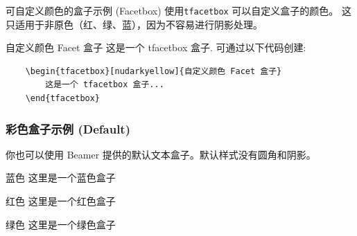 \documentclass[aspectratio=1610,fontset=none]{ctexbeamer}
\begin{document}
    \begin{frame}[fragile]{可自定义颜色的盒子示例 (Facetbox)}
        使用\texttt{tfacetbox} 可以自定义盒子的颜色。 这只适用于非原色（红、绿、蓝），因为不容易进行阴影处理。
        \begin{tfacetbox}[nudarkyellow]{自定义颜色 Facet 盒子}
            这是一个 tfacetbox 盒子. 可通过以下代码创建:
            \begin{verbatim}
    \begin{tfacetbox}[nudarkyellow]{自定义颜色 Facet 盒子}
        这是一个 tfacetbox 盒子...
    \end{tfacetbox}
            \end{verbatim}
        \end{tfacetbox}
    \end{frame}

    \begin{frame}
        \frametitle{彩色盒子示例 (Default)}
        你也可以使用 Beamer 提供的默认文本盒子。默认样式没有圆角和阴影。
        \begin{block}{蓝色}
            这里是一个蓝色盒子
        \end{block}
        \begin{alertblock}{红色}
            这里是一个红色盒子
        \end{alertblock}
        \begin{exampleblock}{绿色}
            这里是一个绿色盒子
        \end{exampleblock}
        \end{frame}
\end{document}
